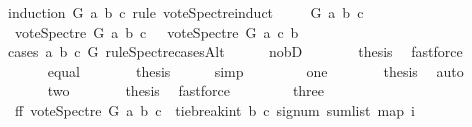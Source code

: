 \begin{isabellebody}
%
\isadelimproof
%
\endisadelimproof
%
\isatagproof
{}\isamarkupfalse%
{\isacharparenleft}{\kern0pt}induction\ G\ a\ b\ c\ rule{\isacharcolon}{\kern0pt}\ vote{\isacharunderscore}{\kern0pt}Spectre{\isachardot}{\kern0pt}induct{\isacharparenright}{\kern0pt}\isanewline
\ \ \isamarkupfalse%
\ {\isacharparenleft}{\kern0pt}{}\ G\ a\ b\ c{\isacharparenright}{\kern0pt}\isanewline
\ \ \isamarkupfalse%
\ {\isachardoublequoteopen}vote{\isacharunderscore}{\kern0pt}Spectre\ G\ a\ b\ c\ {\isacharequal}{\kern0pt}\ {\isacharminus}{\kern0pt}\ vote{\isacharunderscore}{\kern0pt}Spectre\ G\ a\ c\ b{\isachardoublequoteclose}\isanewline
\ \ \isamarkupfalse%
{\isacharparenleft}{\kern0pt}cases\ a\ b\ c\ G\ rule{\isacharcolon}{\kern0pt}Spectre{\isacharunderscore}{\kern0pt}casesAlt{\isacharparenright}{\kern0pt}\isanewline
\ \ \ \ \isamarkupfalse%
\ no{\isacharunderscore}{\kern0pt}bD\isanewline
\ \ \ \ \isamarkupfalse%
\ \isamarkupfalse%
\ {\isacharquery}{\kern0pt}thesis\ \isamarkupfalse%
\ fastforce\isanewline
\ \ \isamarkupfalse%
\isanewline
\ \ \ \ \isamarkupfalse%
\ equal\isanewline
\ \ \ \ \isamarkupfalse%
\ \isamarkupfalse%
\ {\isacharquery}{\kern0pt}thesis\ \isamarkupfalse%
\ {}\ \ \isamarkupfalse%
\ simp\isanewline
\ \ \isamarkupfalse%
\isanewline
\ \ \ \ \isamarkupfalse%
\ one\isanewline
\ \ \ \ \isamarkupfalse%
\ \isamarkupfalse%
\ {\isacharquery}{\kern0pt}thesis\ \isamarkupfalse%
\ auto\ \ \ \isanewline
\ \ \isamarkupfalse%
\isanewline
\ \ \ \ \isamarkupfalse%
\ two\isanewline
\ \ \ \ \isamarkupfalse%
\ \isamarkupfalse%
\ {\isacharquery}{\kern0pt}thesis\ \isamarkupfalse%
\ fastforce\isanewline
\ \ \isamarkupfalse%
\isanewline
\ \ \ \ \isamarkupfalse%
\ three\isanewline
\ \ \ \ \isamarkupfalse%
\ \isamarkupfalse%
\ ff{\isacharcolon}{\kern0pt}\ {\isachardoublequoteopen}vote{\isacharunderscore}{\kern0pt}Spectre\ G\ a\ b\ c\ {\isacharequal}{\kern0pt}\ tie{\isacharunderscore}{\kern0pt}break{\isacharunderscore}{\kern0pt}int\ b\ c\ {\isacharparenleft}{\kern0pt}signum\ {\isacharparenleft}{\kern0pt}sum{\isacharunderscore}{\kern0pt}list\ {\isacharparenleft}{\kern0pt}map\ {\isacharparenleft}{\kern0pt}{\isasymlambda}i{\isachardot}{\kern0pt}\isanewline

\end{isabellebody}
